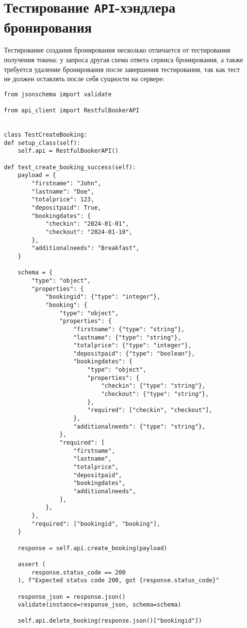 \section{Тестирование \texttt{API}-хэндлера бронирования}

Тестирование создания бронирования несколько отличается от тестирования получения токена: у запроса другая схема ответа сервиса бронирования, а также требуется удаление бронирования после завершения тестирования, так как тест не должен оставлять после себя сущности на сервере:

\begin{verbatim}
from jsonschema import validate

from api_client import RestfulBookerAPI


class TestCreateBooking:
def setup_class(self):
    self.api = RestfulBookerAPI()

def test_create_booking_success(self):
    payload = {
        "firstname": "John",
        "lastname": "Doe",
        "totalprice": 123,
        "depositpaid": True,
        "bookingdates": {
            "checkin": "2024-01-01",
            "checkout": "2024-01-10",
        },
        "additionalneeds": "Breakfast",
    }

    schema = {
        "type": "object",
        "properties": {
            "bookingid": {"type": "integer"},
            "booking": {
                "type": "object",
                "properties": {
                    "firstname": {"type": "string"},
                    "lastname": {"type": "string"},
                    "totalprice": {"type": "integer"},
                    "depositpaid": {"type": "boolean"},
                    "bookingdates": {
                        "type": "object",
                        "properties": {
                            "checkin": {"type": "string"},
                            "checkout": {"type": "string"},
                        },
                        "required": ["checkin", "checkout"],
                    },
                    "additionalneeds": {"type": "string"},
                },
                "required": [
                    "firstname",
                    "lastname",
                    "totalprice",
                    "depositpaid",
                    "bookingdates",
                    "additionalneeds",
                ],
            },
        },
        "required": ["bookingid", "booking"],
    }

    response = self.api.create_booking(payload)

    assert (
        response.status_code == 200
    ), f"Expected status code 200, got {response.status_code}"

    response_json = response.json()
    validate(instance=response_json, schema=schema)

    self.api.delete_booking(response.json()["bookingid"])
\end{verbatim}

